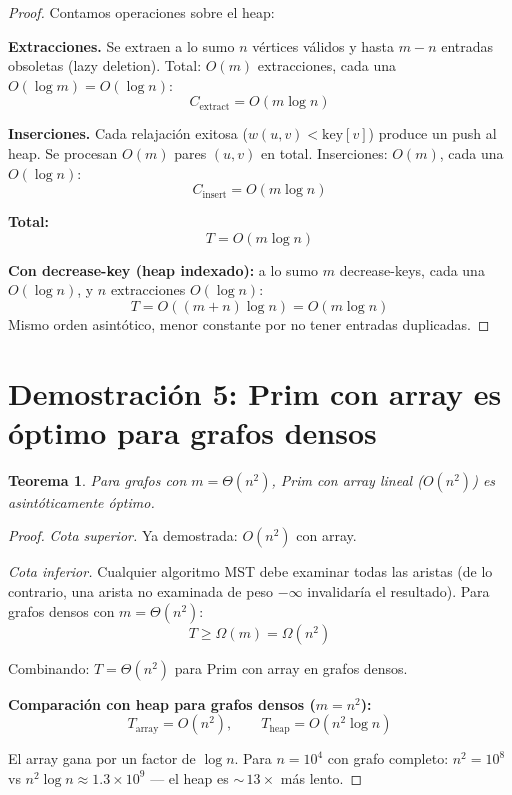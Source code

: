 \documentclass[11pt, letterpaper]{article}
\theoremstyle{definition}
\theoremstyle{plain}
\newtheorem{theorem}{Teorema}[section]
\theoremstyle{remark}
\begin{document}
\begin{proof}
Contamos operaciones sobre el heap:

\textbf{Extracciones.} Se extraen a lo sumo $n$ vértices válidos y
hasta $m - n$ entradas obsoletas (lazy deletion). Total: $O(m)$
extracciones, cada una $O(\log m) = O(\log n)$:
\[
  C_{\text{extract}} = O(m \log n)
\]

\textbf{Inserciones.} Cada relajación exitosa
($w(u,v) < \mathrm{key}[v]$) produce un push al heap. Se procesan
$O(m)$ pares $(u, v)$ en total. Inserciones: $O(m)$, cada una
$O(\log n)$:
\[
  C_{\text{insert}} = O(m \log n)
\]

\textbf{Total:}
\[
  T = O(m \log n)
\]

\textbf{Con decrease-key (heap indexado):} a lo sumo $m$
decrease-keys, cada una $O(\log n)$, y $n$ extracciones
$O(\log n)$:
\[
  T = O((m + n) \log n) = O(m \log n)
\]
Mismo orden asintótico, menor constante por no tener entradas
duplicadas.
\end{proof}

\section{Demostración 5: Prim con array es óptimo para grafos densos}

\begin{theorem}\label{thm:dense}
Para grafos con $m = \Theta(n^2)$, Prim con array lineal ($O(n^2)$)
es asintóticamente óptimo.
\end{theorem}

\begin{proof}
\emph{Cota superior.} Ya demostrada: $O(n^2)$ con array.

\emph{Cota inferior.} Cualquier algoritmo MST debe examinar todas
las aristas (de lo contrario, una arista no examinada de peso
$-\infty$ invalidaría el resultado). Para grafos densos con
$m = \Theta(n^2)$:
\[
  T \geq \Omega(m) = \Omega(n^2)
\]

Combinando: $T = \Theta(n^2)$ para Prim con array en grafos densos.

\textbf{Comparación con heap para grafos densos ($m = n^2$):}
\[
  T_{\text{array}} = O(n^2), \qquad
  T_{\text{heap}} = O(n^2 \log n)
\]

El array gana por un factor de $\log n$. Para $n = 10^4$ con grafo
completo: $n^2 = 10^8$ vs $n^2 \log n \approx 1.3 \times 10^9$
--- el heap es ${\sim}\,13\times$ más lento.
\end{proof}
\end{document}
